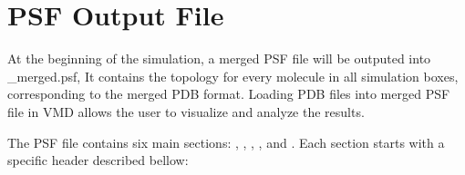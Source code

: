 \documentclass[letterpaper,10pt,english]{sphinxmanual}
\begin{document}
\section{PSF Output File}
\label{\detokenize{output_file:psf-output-file}}
\sphinxAtStartPar
At the beginning of the simulation, a merged PSF file will be outputed into \_merged.psf,
It contains the topology for every molecule in all simulation boxes, corresponding to the merged PDB format.
Loading PDB files into merged PSF file in VMD allows the user to visualize and analyze the results.

\sphinxAtStartPar
The PSF file contains six main sections: , , , , and .
Each section starts with a specific header described bellow:
\end{document}
